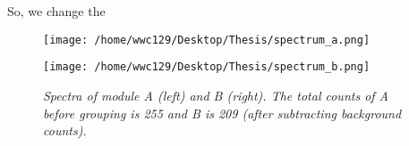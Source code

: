 \documentclass[12pt]{report}
\newcommand{\mycaption}[1]{\caption{\textit{\footnotesize #1}}}
\begin{document}
        \indent So, we change the 
        
        
        \begin{figure}[!ht]
          \begin{minipage}[c]{0.45\textwidth}
            \begin{flushleft} 
                \texttt{[image: /home/wwc129/Desktop/Thesis/spectrum\_a.png]}
            \end{flushleft}
            \end{minipage}
          \begin{minipage}{0.45\textwidth}
            \begin{flushleft}
            \texttt{[image: /home/wwc129/Desktop/Thesis/spectrum\_b.png]}
            \end{flushleft}
          \end{minipage}
          \centering
          \begin{minipage}{0.8\textwidth}
          \mycaption{Spectra of module A (left) and B (right). The total counts of A before grouping is 
                      255 and B is 209 (after subtracting background counts).}
          \label{spectra}
          \end{minipage}
          \end{figure}
        













		
			

    
\end{document}
